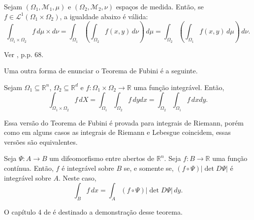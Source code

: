 \documentclass[a4paper, 11pt]{book}
\theoremstyle{definition}
\newcommand{\bR}{\mathbb{R}}
\newcommand{\cM}{\mathcal{M}}
\newcommand{\cL}{\mathcal{L}}
\begin{document}
\footnotetext{}

\begin{tbox} \label{thm:fubini}
    Sejam $(\Omega_1, \cM_1, \mu)$ e $(\Omega_2, \cM_2, \nu)$ espaços de medida.
    Então, se $f \in \cL^1(\Omega_1 \times \Omega_2)$, a igualdade abaixo é válida:
    \[
        \int_{\Omega_1 \times \Omega_2} f \, d\mu \times d\nu = \int_{\Omega_1} \left( \int_{\Omega_2} f(x,y) \,d \nu \right) \, d\mu = \int_{\Omega_2} \left( \int_{\Omega_1} f(x,y) \,d\mu \right) \,d\nu.
    \]
\end{tbox}
\begin{prf}
    Ver \cite{folland-real.analysis}, p.p. 68.
\end{prf}

Uma outra forma de enunciar o Teorema de Fubini é a seguinte.
\begin{tbox}
    Sejam $\Omega_1 \subseteq \bR^n$, $\Omega_2  \subseteq \bR^d$ e $f : \Omega_1 \times \Omega_2 \to \bR$ uma função integrável.
Então,
\[
    \int_{\Omega_1 \times \Omega_2} f \,dX = \int_{\Omega_1} \int_{\Omega_2} f \, dydx = \int_{\Omega_2} \int_{\Omega_1} f \,dxdy.
\]
\end{tbox}

Essa versão do Teorema de Fubini é provada para integrais de Riemann, porém como em alguns casos as integrais de Riemann e Lebesgue coincidem, essas versões são equivalentes.


\begin{tbox} \label{thm:mudanca-de-variaveis}
    Seja $\Psi : A \to B$ um difeomorfismo entre abertos de $\bR^n$. Seja $f : B \to \bR$ uma função contínua. Então, $f$ é integrável sobre $B$ se, e somente se, $(f \circ \Psi) |\det D\Psi|$ é integrável sobre $A$. Neste caso,
    \[
        \int_B f \,dx = \int_A (f \circ \Psi) |\det D\Psi| \,dy.
    \]
\end{tbox}
\begin{prf}
    O capítulo 4 de \cite{munkres-analysis.on.manifolds} é destinado a demonstração desse teorema.
\end{prf}
\end{document}
